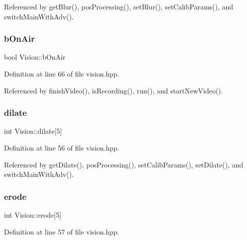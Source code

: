 Referenced by get\+Blur(), pos\+Processing(), set\+Blur(), set\+Calib\+Params(), and switch\+Main\+With\+Adv().

\mbox{\label{class_vision_a1eb56f5e3433ca3dce53fe315b845979}} 
\subsubsection{\texorpdfstring{b\+On\+Air}{bOnAir}}
{\footnotesize\ttfamily bool Vision\+::b\+On\+Air\hspace{0.3cm}{\ttfamily [private]}}



Definition at line 66 of file vision.\+hpp.



Referenced by finish\+Video(), is\+Recording(), run(), and start\+New\+Video().

\mbox{\label{class_vision_a406af58255882218a4d49f41b7e3a67a}} 
\subsubsection{\texorpdfstring{dilate}{dilate}}
{\footnotesize\ttfamily int Vision\+::dilate\mbox{[}5\mbox{]}\hspace{0.3cm}{\ttfamily [private]}}



Definition at line 56 of file vision.\+hpp.



Referenced by get\+Dilate(), pos\+Processing(), set\+Calib\+Params(), set\+Dilate(), and switch\+Main\+With\+Adv().

\mbox{\label{class_vision_a441302204181d31885b611e10ea92489}} 
\subsubsection{\texorpdfstring{erode}{erode}}
{\footnotesize\ttfamily int Vision\+::erode\mbox{[}5\mbox{]}\hspace{0.3cm}{\ttfamily [private]}}



Definition at line 57 of file vision.\+hpp.



